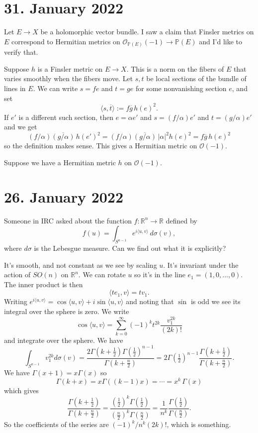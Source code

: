\documentclass[11pt]{amsart}
\theoremstyle{definition}
\newcommand{\kk}[1]{\mathbb{#1}}
\newcommand{\cc}[1]{\mathcal{#1}}
\def\ov#1{\overline{#1}}
\begin{document}
\section*{31. January 2022}

Let $E \to X$ be a holomorphic vector bundle. I saw a claim that Finsler metrics
on $E$ correspond to Hermitian metrics on $\cc O_{\kk P(E)}(-1) \to \kk P(E)$ and I'd like
to verify that.

Suppose $h$ is a Finsler metric on $E \to X$. This is a norm on the fibers of
$E$ that varies smoothly when the fibers move. Let $s,t$ be local sections of
the bundle of lines in $E$. We can write $s = fe$ and $t = ge$ for some
nonvanishing section $e$, and set
$$
\langle s, \ov t \rangle
:= f \ov g \, h(e)^2.
$$
If $e'$ is a different such section, then $e = \alpha e'$ and $s = (f/ \alpha)
e'$ and $t = (g/\alpha)e'$ and we get
$$
(f/\alpha) \ov{(g/\alpha)} \, h(e')^2
= (f/\alpha) \ov{(g/\alpha)} \, |\alpha|^2 h(e)^2
= f \ov{g} \, h(e)^2
$$
so the definition makes sense. This gives a Hermitian metric on $\cc O(-1)$.

Suppose we have a Hermitian metric $h$ on $\cc O(-1)$.

\section*{26. January 2022}

Someone in IRC asked about the function $f: \kk R^n \to \kk R$ defined by
$$
f(u)
= \int_{S^{n-1}} e^{i \langle u, v \rangle}\, d\sigma(v),
$$
where $d\sigma$ is the Lebesgue measure. Can we find out what it is explicitly?

It's smooth, and not constant as we see by scaling $u$. It's invariant under the
action of $SO(n)$ on $\kk R^n$. We can rotate $u$ so it's in the line
$e_1 = (1,0,\ldots,0)$. The inner product is then
$$
\langle t e_1, v \rangle
= t v_1.
$$
Writing $e^{i\langle u, v \rangle} = \cos\langle u, v \rangle + i \sin\langle u,
v \rangle$ and noting that $\sin$ is odd we see its integral over the sphere is
zero. We write
$$
\cos\langle u, v \rangle
= \sum_{k = 0}^\infty (-1)^k t^{2k} \frac{v_1^{2k}}{(2k)!}
$$
and integrate over the sphere. We have
$$
\int_{S^{n-1}} v_1^{2k} d\sigma(v)
= \frac{2\Gamma(k + \frac12)\Gamma(\frac12)^{n-1}}{\Gamma(k+\frac n2)}
= 2\Gamma(\tfrac12)^{n-1} \frac{\Gamma(k + \frac12)}{\Gamma(k+\frac n2)}.
$$
We have
$
\Gamma(x + 1) = x \Gamma(x)
$
so
$$
\Gamma(k+x)
= x \Gamma((k-1) x)
= \cdots
= x^k \, \Gamma(x)
$$
which gives
$$
\frac{\Gamma(k + \frac12)}{\Gamma(k+\frac n2)}
= \frac{(\frac12)^k\Gamma(\frac12)}{(\frac n2)^k\Gamma(\frac n2)}
= \frac{1}{n^k} \frac{\Gamma(\frac12)}{\Gamma(\frac n2)}.
$$
So the coefficients of the series are $(-1)^k /n^k (2k)!$, which is something.
\end{document}
